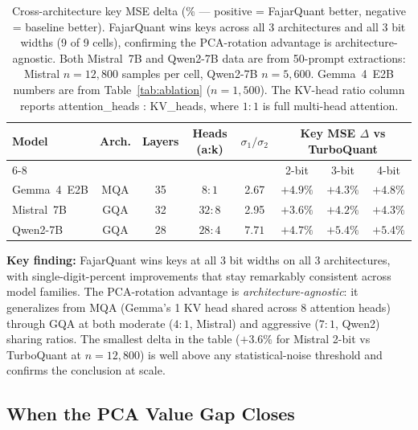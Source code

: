 \documentclass[10pt,twocolumn]{article}
\begin{document}
\begin{table}[t]
\centering
\small
\caption{Cross-architecture key MSE delta (\% — positive = FajarQuant
better, negative = baseline better). FajarQuant wins keys across all
3 architectures and all 3 bit widths (9 of 9 cells), confirming the
PCA-rotation advantage is architecture-agnostic. Both Mistral~7B and
Qwen2-7B data are from 50-prompt extractions: Mistral $n{=}12{,}800$
samples per cell, Qwen2-7B $n{=}5{,}600$. Gemma~4~E2B numbers are
from Table~\ref{tab:ablation} ($n{=}1{,}500$). The KV-head ratio
column reports attention\_heads : KV\_heads, where $1{:}1$ is full
multi-head attention.}
\label{tab:crossmodel}
\begin{tabular}{lccccccc}
\toprule
\multirow{2}{*}{Model} & \multirow{2}{*}{Arch.} & \multirow{2}{*}{Layers} & \multirow{2}{*}{Heads (a:k)} & \multirow{2}{*}{$\sigma_1/\sigma_2$} & \multicolumn{3}{c}{Key MSE $\Delta$ vs TurboQuant} \\
\cmidrule(lr){6-8}
 & & & & & 2-bit & 3-bit & 4-bit \\
\midrule
Gemma~4~E2B  & MQA      & 35 & $8{:}1$ & 2.67 & $\mathbf{+4.9\%}$ & $\mathbf{+4.3\%}$ & $\mathbf{+4.8\%}$ \\
Mistral~7B   & GQA      & 32 & $32{:}8$ & 2.95 & $\mathbf{+3.6\%}$ & $\mathbf{+4.2\%}$ & $\mathbf{+4.3\%}$ \\
Qwen2-7B     & GQA      & 28 & $28{:}4$ & $\mathbf{7.71}$ & $\mathbf{+4.7\%}$ & $\mathbf{+5.4\%}$ & $\mathbf{+5.4\%}$ \\
\bottomrule
\end{tabular}
\end{table}

\textbf{Key finding:} FajarQuant wins keys at all 3 bit widths on all
3 architectures, with single-digit-percent improvements that stay
remarkably consistent across model families. The PCA-rotation
advantage is \emph{architecture-agnostic}: it generalizes from MQA
(Gemma's 1 KV head shared across 8 attention heads) through GQA at
both moderate ($4{:}1$, Mistral) and aggressive ($7{:}1$, Qwen2)
sharing ratios. The smallest delta in the table ($+3.6\%$ for Mistral
2-bit vs TurboQuant at $n{=}12{,}800$) is well above any
statistical-noise threshold and confirms the conclusion at scale.

\subsection{When the PCA Value Gap Closes}
\label{sec:value-gap-closes}
\end{document}
